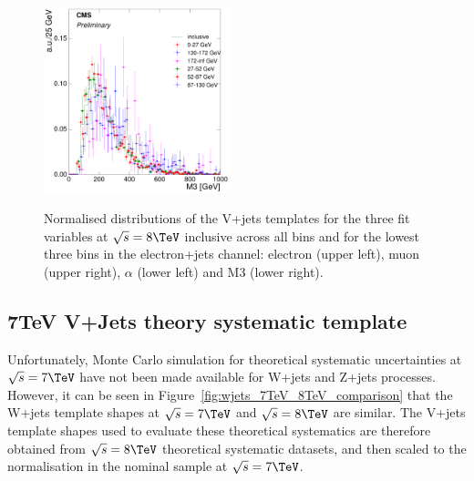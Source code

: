 \begin{figure}[hbtp]
     \includegraphics[width=0.48\textwidth]{Chapters/04_Analysis/04b_XSections/images/8TeV/fit_variables/electron/MET/M3/vjets/MET_M3_2orMoreBtags_VJets_template_comparison.pdf}\\
	 \caption{Normalised distributions of the V+jets templates for the three fit variables at $\sqrt{s}=8\TeV$
	 inclusive across all \met bins and for the lowest three \met bins in the electron+jets channel: electron
	 \abseta (upper left), muon \abseta (upper right), $\alpha$ (lower left) and M3 (lower right).}
     \label{fig:MET_fit_variable_vjets_comparisons_8TeV}
\end{figure}
\FloatBarrier

\subsection{7TeV V+Jets theory systematic template}
\label{ss:7TeV_vjets_theory_systematic_template}
Unfortunately, Monte Carlo simulation for theoretical systematic uncertainties at $\sqrt{s}=7\TeV$ have not
been made available for W+jets and Z+jets processes. However, it can be seen in
Figure~\ref{fig:wjets_7TeV_8TeV_comparison} that the W+jets template shapes at $\sqrt{s}=7\TeV$ and
$\sqrt{s}=8\TeV$ are similar. The V+jets template shapes used to evaluate these theoretical systematics are
therefore obtained from $\sqrt{s}=8\TeV$ theoretical systematic datasets, and then scaled to the normalisation
in the nominal sample at $\sqrt{s}=7\TeV$.

